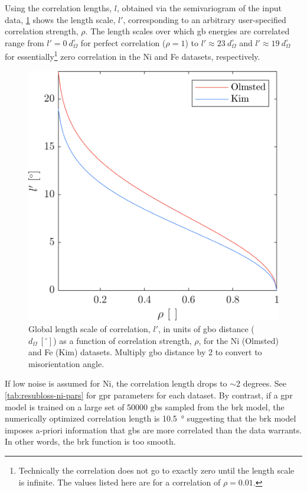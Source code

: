 \documentclass[final,twocolumn,12pt]{elsarticle}
\begin{document}
	Using the correlation lengths, $l$, obtained via the semivariogram of the input data, \cref{fig:correlationlengthvsrho} shows the length scale, $l'$, corresponding to an arbitrary user-specified correlation strength, $\rho$. The length scales over which \gls{gb} energies are correlated range from $l' = 0\ d_{\Omega}^{\circ}$ for perfect correlation ($\rho = 1$) to $l' \approx 23\ d_{\Omega}^{\circ}$ and $l' \approx 19\ d_{\Omega}^{\circ}$ for essentially\footnote{Technically the correlation does not go to exactly zero until the length scale is infinite. The values listed here are for a correlation of $\rho = 0.01$.} zero correlation in the Ni and Fe datasets, respectively.
	\begin{figure}
	    \centering
	    \includegraphics[scale=1]{figures/CorrelationLengthVsRho.png}
	    \caption{Global length scale of correlation, $l'$, in units of \gls{gbo} distance ($d_\Omega\ [{}^{\circ}]$) as a function of correlation strength, $\rho$, for the Ni (Olmsted) and Fe (Kim) datasets. Multiply \gls{gbo} distance by 2 to convert to misorientation angle.}
	    \label{fig:correlationlengthvsrho}
	\end{figure}
	
	If low noise is assumed for Ni, the correlation length drops to $\sim$2 degrees. See \cref{tab:resubloss-ni-pars} for \gls{gpr} parameters for each dataset. By contrast, if a \gls{gpr} model is trained on a large set of \num{50000} \glspl{gb} sampled from the \gls{brk} model, the numerically optimized correlation length is \SI{10.5}{\degree} suggesting that the \gls{brk} model imposes a-priori information that \glspl{gb} are more correlated than the data warrants. In other words, the \gls{brk} function is too smooth.
	
\end{document}
